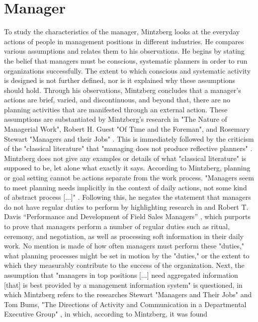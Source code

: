\documentclass[a4paper,12pt]{article}
\begin{document}
\section{Manager}
To study the characteristics of the manager, Mintzberg looks at the everyday
actions of people in management positions in different industries. He compares
various assumptions and relates them to his observations. He begins by stating
the belief that managers must be conscious, systematic planners in order to
run organizations successfully. The extent to which conscious and systematic
activity is designed is not further defined, nor is it explained why these
assumptions should hold. Through his observations, Mintzberg concludes that a
manager's actions are brief, varied, and discontinuous, and beyond that, there
are no planning activities that are manifested through an external
action. These assumptions are substantiated by Mintzberg's research in "The
Nature of Managerial Work", Robert H. Guest "Of Time and the Foreman",
\cite{guest} and Rosemary Stewart "Managers and their Jobs" \cite{stewart}.
This is immediately followed by the criticism of the "classical literature"
that "managing does not produce reflective planners" \cite[p.25]{Mintzberg}.
Mintzberg does not give any examples or details of what "classical literature"
is supposed to be, let alone what exactly it says. According to Mintzberg,
planning or goal setting cannot be actions separate from the work
process. "Managers seem to meet planning needs implicitly in the context of
daily actions, not some kind of abstract process [...]"
\cite[p.25]{Mintzberg}.  Following this, he negates the statement that
managers do not have regular duties to perform by highlighting research in
\cite{Mintzberg2} and Robert T. Davis ``Performance and Development of Field
Sales Managers'' \cite{davis}, which purports to prove that managers perform a
number of regular duties such as ritual, ceremony, and negotiation, as well as
processing soft information in their daily work. No mention is made of how
often managers must perform these "duties," what planning processes might be
set in motion by the "duties," or the extent to which they measurably
contribute to the success of the organization. Next, the assumption that
"managers in top positions [...] need aggregated information [that] is best
provided by a management information system" is questioned, in which Mintzberg
refers to the researches Stewart "Managers and Their Jobs" \cite{stewart2} and
Tom Bums, "The Directions of Activity and Communication in a Departmental
Executive Group" \cite{burns}, in which, according to Mintzberg, it was found
\end{document}
